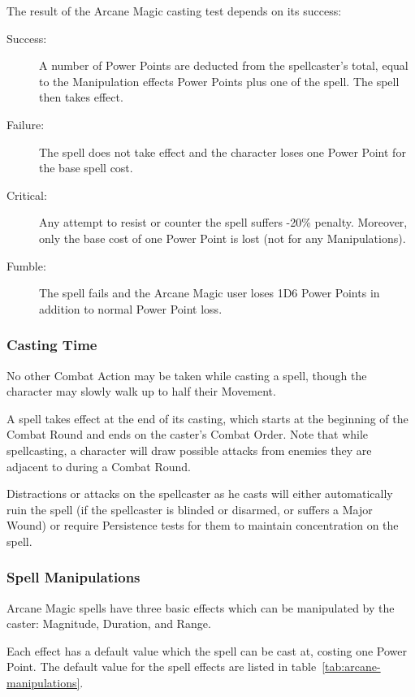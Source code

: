 The result of the Arcane Magic casting test depends on its success:
\begin{description}
	\item[Success:] A number of Power Points are deducted from the spellcaster’s total, equal to the Manipulation effects Power Points plus one of the spell. The spell then takes effect.
	\item[Failure:] The spell does not take effect and the character loses one Power Point for the base spell cost.
	\item[Critical:] Any attempt to resist or counter the spell suffers -20\% penalty. Moreover, only the base cost of one Power Point is lost (not for any Manipulations).
	\item[Fumble:] The spell fails and the Arcane Magic user loses 1D6 Power Points in addition to normal Power Point loss.
\end{description}


\subsubsection{Casting Time}
No other Combat Action may be taken while casting a spell, though the character may slowly walk up to half their Movement. 

A spell takes effect at the end of its casting, which starts at the beginning of the Combat Round and ends on the caster's Combat Order. Note that while spellcasting, a character will draw possible attacks from enemies they are adjacent to during a Combat Round. 

Distractions or attacks on the spellcaster as he casts will either automatically ruin the spell (if the spellcaster is blinded or disarmed, or suffers a Major Wound) or require Persistence tests for them to maintain concentration on the spell. 

\subsubsection{Spell Manipulations}
Arcane Magic spells have three basic effects which can be manipulated by the caster: Magnitude, Duration, and Range.

Each effect has a default value which the spell can be cast at, costing one Power Point. The default value for the spell effects are listed in table~\ref{tab:arcane-manipulations}.

